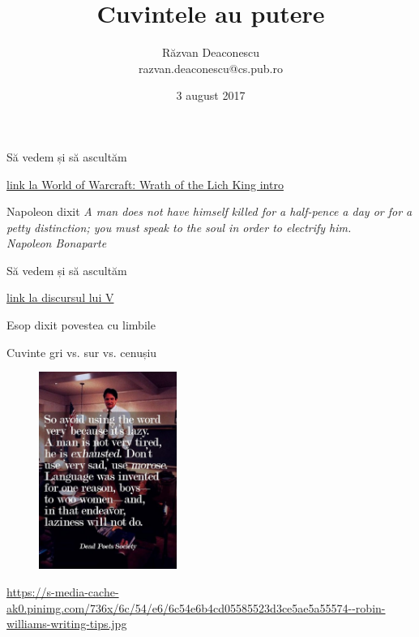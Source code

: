\documentclass{beamer}
\title[Cuvintele au putere]{Cuvintele au putere}
\institute{InfoEducație 2017 (Gălăciuc, Vrancea)}
\author[Răzvan Deaconescu]{Răzvan Deaconescu \\
razvan.deaconescu@cs.pub.ro}
\date{3 august 2017}
\begin{document}
\frame{\titlepage}

\begin{frame}{Să vedem și să ascultăm}
  \begin{center}
    \scriptsize
    \url{link la World of Warcraft: Wrath of the Lich King intro}
  \end{center}
\end{frame}

\begin{frame}{Napoleon dixit}
  \centering
  \textit{A man does not have himself killed for a half-pence a day or for a petty distinction; you must speak to the soul in order to electrify him.}\\
  \vspace{3mm}
  \hfill \textit{Napoleon Bonaparte}
\end{frame}

\begin{frame}{Să vedem și să ascultăm}
  \begin{center}
    \scriptsize
    \url{link la discursul lui V}
  \end{center}
\end{frame}

\begin{frame}{Esop dixit}
  povestea cu limbile
\end{frame}

\begin{frame}{Cuvinte}
  gri vs. sur vs. cenușiu \\
  \begin{figure}
    \centering
    \includegraphics[width=0.4\textwidth]{img/dead-poets-society-lazy}
  \end{figure}
  \begin{center}
    \tiny
    \url{https://s-media-cache-ak0.pinimg.com/736x/6c/54/e6/6c54e6b4cd05585523d3ce5ae5a55574--robin-williams-writing-tips.jpg}
  \end{center}
\end{frame}
\end{document}
